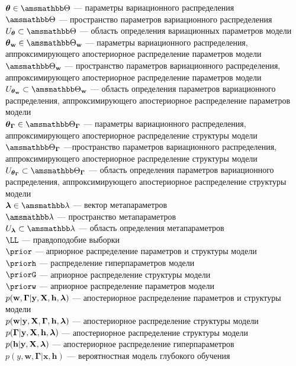 $\teta \in \Tetab$ --- параметры вариационного распределения\\
$\Tetab$ --- пространство параметров вариационного распределения\\
$\Uteta \subset \Tetab$ --- область определения вариационных параметров модели\\
$\tetaw \in \Tetawb$ --- параметры вариационного распределения, аппроксимирующего апостериорное распределение параметров модели\\
$\Tetawb$ --- пространство параметров вариационного распределения, аппроксимирующего апостериорное распределение параметров модели\\
$\Utetaw \subset \Tetawb$ --- область определения параметров вариационного распределения, аппроксимирующего апостериорное распределение параметров модели\\
$\tetaG \in \TetaGb$ --- параметры вариационного распределения, аппроксимирующего апостериорное распределение структуры модели\\
$\TetaGb$ ---пространство параметров вариационного распределения, аппроксимирующего апостериорное распределение структуры модели\\
$\UtetaG \subset \TetaGb$ --- область определения параметров вариационного распределения, аппроксимирующего апостериорное распределение структуры модели\\
$\lam \in \Lamb$ --- вектор метапараметров\\
$\Lamb$ --- пространство метапараметров\\
$\Ulam \subset \Lamb$ --- область определения  метапараметров\\
$\LL$ --- правдоподобие выборки\\
$\prior$ --- априорное распределение параметров и структуры модели\\
$\priorh$ ---  распределение гиперпараметров модели\\
$\priorG$ --- априорное распределение структуры модели\\
$\priorw$ --- априорное распределение  параметров модели\\
$p(\mathbf{w}, \boldsymbol{\Gamma}|\mathbf{y}, \mathbf{X}, \mathbf{h},\boldsymbol{\lambda})$ --- апостериорное распределение параметров и структуры модели\\
$p(\mathbf{w}|\mathbf{y}, \mathbf{X}, \boldsymbol{\Gamma}, \mathbf{h},\boldsymbol{\lambda})$ --- апостериорное распределение структуры модели\\
$p(\boldsymbol{\Gamma}|\mathbf{y}, \mathbf{X}, \mathbf{h},\boldsymbol{\lambda})$ --- апостериорное распределение  структуры модели\\
$p(\mathbf{h}|\mathbf{y}, \mathbf{X},\boldsymbol{\lambda})$ --- апостериорное распределение  гиперпараметров \\
$p({y}, \mathbf{w},  \boldsymbol{\Gamma}|\mathbf{x}, \mathbf{h})$ --- вероятностная модель глубокого обучения\\

